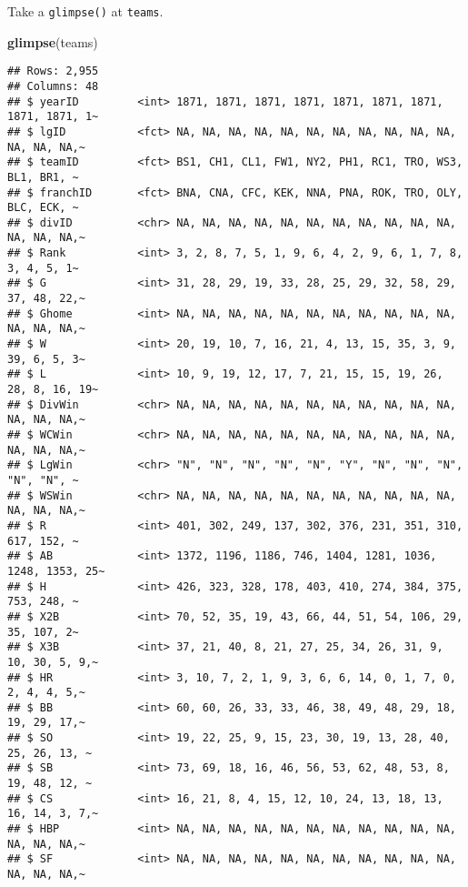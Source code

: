 \documentclass[
]{article}
\newenvironment{Shaded}{\begin{snugshade}}{\end{snugshade}}
\newcommand{\KeywordTok}[1]{\textcolor[rgb]{0.13,0.29,0.53}{\textbf{#1}}}
\newcommand{\NormalTok}[1]{#1}
\begin{document}
Take a \texttt{glimpse()} at \texttt{teams}.

\begin{Shaded}
\begin{Highlighting}[]
\KeywordTok{glimpse}\NormalTok{(teams)}
\end{Highlighting}
\end{Shaded}

\begin{verbatim}
## Rows: 2,955
## Columns: 48
## $ yearID         <int> 1871, 1871, 1871, 1871, 1871, 1871, 1871, 1871, 1871, 1~
## $ lgID           <fct> NA, NA, NA, NA, NA, NA, NA, NA, NA, NA, NA, NA, NA, NA,~
## $ teamID         <fct> BS1, CH1, CL1, FW1, NY2, PH1, RC1, TRO, WS3, BL1, BR1, ~
## $ franchID       <fct> BNA, CNA, CFC, KEK, NNA, PNA, ROK, TRO, OLY, BLC, ECK, ~
## $ divID          <chr> NA, NA, NA, NA, NA, NA, NA, NA, NA, NA, NA, NA, NA, NA,~
## $ Rank           <int> 3, 2, 8, 7, 5, 1, 9, 6, 4, 2, 9, 6, 1, 7, 8, 3, 4, 5, 1~
## $ G              <int> 31, 28, 29, 19, 33, 28, 25, 29, 32, 58, 29, 37, 48, 22,~
## $ Ghome          <int> NA, NA, NA, NA, NA, NA, NA, NA, NA, NA, NA, NA, NA, NA,~
## $ W              <int> 20, 19, 10, 7, 16, 21, 4, 13, 15, 35, 3, 9, 39, 6, 5, 3~
## $ L              <int> 10, 9, 19, 12, 17, 7, 21, 15, 15, 19, 26, 28, 8, 16, 19~
## $ DivWin         <chr> NA, NA, NA, NA, NA, NA, NA, NA, NA, NA, NA, NA, NA, NA,~
## $ WCWin          <chr> NA, NA, NA, NA, NA, NA, NA, NA, NA, NA, NA, NA, NA, NA,~
## $ LgWin          <chr> "N", "N", "N", "N", "N", "Y", "N", "N", "N", "N", "N", ~
## $ WSWin          <chr> NA, NA, NA, NA, NA, NA, NA, NA, NA, NA, NA, NA, NA, NA,~
## $ R              <int> 401, 302, 249, 137, 302, 376, 231, 351, 310, 617, 152, ~
## $ AB             <int> 1372, 1196, 1186, 746, 1404, 1281, 1036, 1248, 1353, 25~
## $ H              <int> 426, 323, 328, 178, 403, 410, 274, 384, 375, 753, 248, ~
## $ X2B            <int> 70, 52, 35, 19, 43, 66, 44, 51, 54, 106, 29, 35, 107, 2~
## $ X3B            <int> 37, 21, 40, 8, 21, 27, 25, 34, 26, 31, 9, 10, 30, 5, 9,~
## $ HR             <int> 3, 10, 7, 2, 1, 9, 3, 6, 6, 14, 0, 1, 7, 0, 2, 4, 4, 5,~
## $ BB             <int> 60, 60, 26, 33, 33, 46, 38, 49, 48, 29, 18, 19, 29, 17,~
## $ SO             <int> 19, 22, 25, 9, 15, 23, 30, 19, 13, 28, 40, 25, 26, 13, ~
## $ SB             <int> 73, 69, 18, 16, 46, 56, 53, 62, 48, 53, 8, 19, 48, 12, ~
## $ CS             <int> 16, 21, 8, 4, 15, 12, 10, 24, 13, 18, 13, 16, 14, 3, 7,~
## $ HBP            <int> NA, NA, NA, NA, NA, NA, NA, NA, NA, NA, NA, NA, NA, NA,~
## $ SF             <int> NA, NA, NA, NA, NA, NA, NA, NA, NA, NA, NA, NA, NA, NA,~

\end{verbatim}
\end{document}
